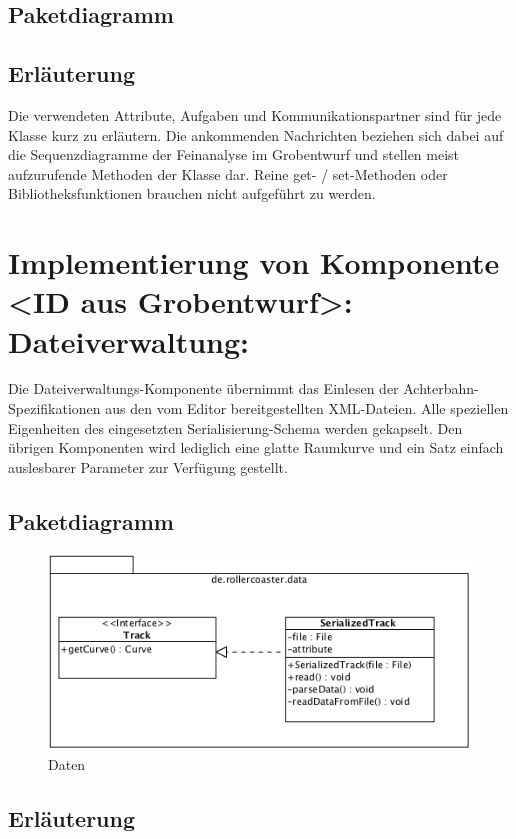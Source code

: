 \subsection{Paketdiagramm}
\subsection{Erläuterung}

Die verwendeten Attribute, Aufgaben und Kommunikationspartner sind für jede
Klasse kurz zu erläutern. Die ankommenden Nachrichten beziehen sich dabei auf
die Sequenzdiagramme der Feinanalyse im Grobentwurf und stellen meist
aufzurufende Methoden der Klasse dar.  Reine get- / set-Methoden oder
Bibliotheksfunktionen brauchen nicht aufgeführt zu werden.

\section{Implementierung von Komponente
         <ID aus Grobentwurf>: Dateiverwaltung:}

Die Dateiverwaltungs-Komponente übernimmt das Einlesen der Achterbahn-Spezifikationen 
aus den vom Editor bereitgestellten XML-Dateien. Alle speziellen Eigenheiten des
eingesetzten Serialisierung-Schema werden gekapselt. Den übrigen Komponenten wird 
lediglich eine glatte Raumkurve und ein Satz einfach auslesbarer Parameter zur Verfügung
gestellt.

\subsection{Paketdiagramm}

\begin{figure}
\includegraphics[width=\linewidth]{bilder/Data}
\caption{Daten}
\end{figure}

\subsection{Erläuterung}

